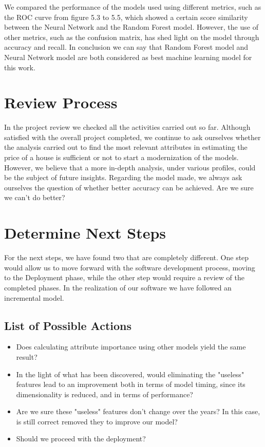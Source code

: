 We compared the performance of the models used using different metrics, such as the ROC curve from figure 5.3 to 5.5, which showed a certain score similarity between the Neural Network and the Random Forest model. However, the use of other metrics, such as the confusion matrix, has shed light on the model through accuracy and recall. In conclusion we can say that Random Forest model and Neural Network model are both considered as best machine
learning model for this work. 

\section{Review Process}

In the project review we checked all the activities carried out so far. Although satisfied with the overall project completed, we continue to ask ourselves whether the analysis carried out to find the most relevant attributes in estimating the price of a house is sufficient or not to start a modernization of the models. However, we believe that a more in-depth analysis, under various profiles, could be the subject of future insights. Regarding the model made, we always ask ourselves the question of whether better accuracy can be achieved. Are we sure we can't do better?

\section{Determine Next Steps}

For the next steps, we have found two that are completely different. One step would allow us to move forward with the software development process, moving to the Deployment phase, while the other step would require a review of the completed phases. In the realization of our software we have followed an incremental model.

\subsection{List of Possible Actions}
\begin{itemize}
    \item Does calculating attribute importance using other models yield the same result?
    \item In the light of what has been discovered, would eliminating the "useless" features lead to an improvement both in terms of model timing, since its dimensionality is reduced, and in terms of performance?
    \item Are we sure these "useless" features don't change over the years? In this case, is still correct removed they to improve our model?
    \item Should we proceed with the deployment?
\end{itemize}

